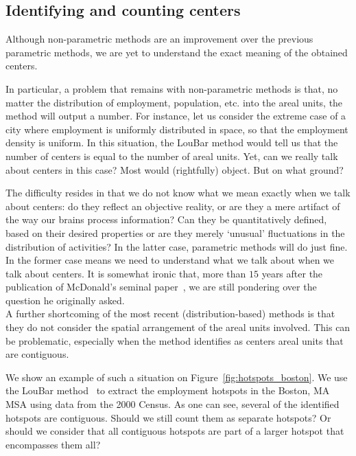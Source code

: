 \subsection{Identifying and counting centers}
\label{sub:measuring_the_number_of_centers}

Although non-parametric methods are an improvement over the previous parametric
methods, we are yet to understand the exact meaning of the obtained centers. 


In particular, a problem that remains with non-parametric methods is that, no
matter the distribution of employment, population, etc. into the areal units,
the method will output a number. For instance, let us consider the extreme case
of a city where employment is uniformly distributed in space, so that the
employment density is uniform. In this situation, the LouBar method would tell
us that the number of centers is equal to the number of areal units. Yet, can we
really talk about centers in this case? Most would (rightfully) object. But on
what ground?

The difficulty resides in that we do not know what we mean exactly when we talk
about centers: do they reflect an objective reality, or are they a mere artifact
of the way our brains process information? Can they be quantitatively defined,
based on their desired properties or are they merely `unusual'
fluctuations in the distribution of activities? In the latter case, parametric
methods will do just fine. In the former case means we need to understand
what we talk about when we talk about centers. It is somewhat ironic that, more than $15$ years
after the publication of McDonald's seminal paper~\cite{McDonald:1987}, we are
still pondering over the question he originally asked.\\


A further shortcoming of the most recent (distribution-based) methods is that
they do not consider the spatial arrangement of the areal units involved. This
can be problematic, especially when the method identifies as centers areal units
that are contiguous. 

We show an example of such a situation on Figure~\ref{fig:hotspots_boston}. We use
the LouBar method~\cite{Louail:2014} to extract the employment hotspots in the
Boston, MA MSA using data from the 2000 Census. As one can see, several of the
identified hotspots are contiguous. Should we still count them as separate
hotspots? Or should we consider that all contiguous hotspots are part of a
larger hotspot that encompasses them all?\\

